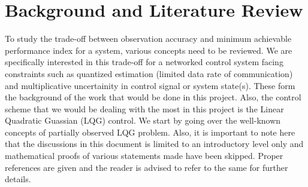 \documentclass[a4paper,12pt]{article}
\begin{document}
\section{Background and Literature Review}
To study the trade-off between observation accuracy and minimum achievable performance index for a system, various concepts need to be reviewed. We are specifically interested in this trade-off for a networked control system facing constraints such as quantized estimation (limited data rate of communication) and multiplicative uncertainity in control signal or system state(s). These form the background of the work that would be done in this project. Also, the control scheme that we would be dealing with the most in this project is the Linear Quadratic Guassian (LQG) control. We start by going over the well-known concepts of partially observed LQG problem. Also, it is important to note here that the discussions in this document is limited to an introductory level only and mathematical proofs of various statements made have been skipped. Proper references are given and the reader is advised to refer to the same for further details.
\end{document}
